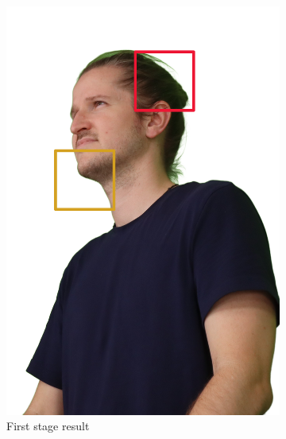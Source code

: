 \begin{figure}[h]
	\centering

	\begin{subfigure}{0.4\linewidth}
		\includegraphics[width=\textwidth]{Figures/processed/masked_6-B-6-2-163452-598.png}
		\caption{First stage result}
		\label{fig:first_stage}
	\end{subfigure}
	\begin{subfigure}{0.4\linewidth}

\end{subfigure}
\end{figure}
